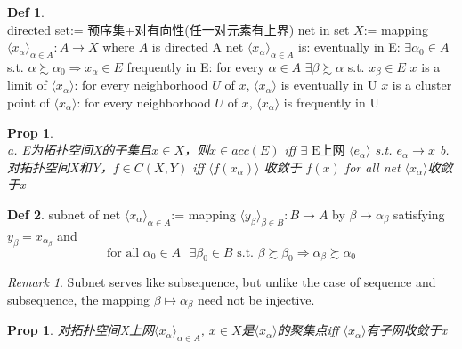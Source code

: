\documentclass[hidelinks]{article}
\theoremstyle{definition}
\newtheorem*{defin}{Def}
\theoremstyle{plain}
\newtheorem{proposition}[theorem]{Prop}
\theoremstyle{remark}
\newtheorem*{remark}{Remark}
\begin{document}
\begin{defin}~\\
directed set:= 预序集+对有向性(任一对元素有上界) \newline
net in set $X$:=  mapping $\langle x_\alpha\rangle_{\alpha \in A}:A\to X$ where $A$ is directed \newline
A net $\langle x_\alpha\rangle_{\alpha \in A}$ is: \newline
\indent eventually in E: $\exists \alpha_0 \in A$ s.t. $\alpha \succsim \alpha_0 \Rightarrow x_\alpha \in E$ \newline
\indent frequently in E: for every $\alpha \in A$ $\exists \beta \succsim \alpha$ s.t. $x_\beta \in E$ \newline
\indent $x$ is a limit of $\langle x_\alpha\rangle$: for every neighborhood $U$ of $x$, $\langle x_\alpha\rangle$ is eventually in U \newline
\indent $x$ is a cluster point of $\langle x_\alpha\rangle$: for every neighborhood $U$ of $x$, $\langle x_\alpha\rangle$ is frequently in U
\end{defin}

\begin{proposition}~\\
a. E为拓扑空间X的子集且$x\in X$，则$x\in acc(E)$ iff $\exists \textrm{ E上网 } \langle e_\alpha\rangle$ s.t. $e_\alpha \to x$ \newline
b. 对拓扑空间X和Y，$f\in C(X,Y)$ iff $\langle f(x_\alpha)\rangle$ 收敛于 $f(x)$ for all net $\langle x_\alpha\rangle$收敛于x
\end{proposition}

\begin{defin}
subnet of net $\langle x_\alpha\rangle_{\alpha \in A}$:= mapping $\langle y_\beta\rangle_{\beta \in B}:B\to A$ by $\beta \mapsto \alpha_\beta$ satisfying $y_\beta=x_{\alpha_\beta}$ and
\[
\textrm{for all }\alpha_0\in A \textrm{ }\exists \beta_0\in B \textrm{ s.t. }\beta \succsim \beta_0 \Rightarrow \alpha_\beta \succsim \alpha_0
\]
\end{defin}

\begin{remark}
Subnet serves like subsequence, but unlike the case of sequence and subsequence, the mapping $\beta \mapsto \alpha_\beta$ need not be injective.
\end{remark}

\begin{proposition}
对拓扑空间X上网$\langle x_\alpha\rangle_{\alpha \in A}$, $x\in X$是$\langle x_\alpha\rangle$的聚集点iff $\langle x_\alpha\rangle$有子网收敛于x
\end{proposition}
\end{document}
